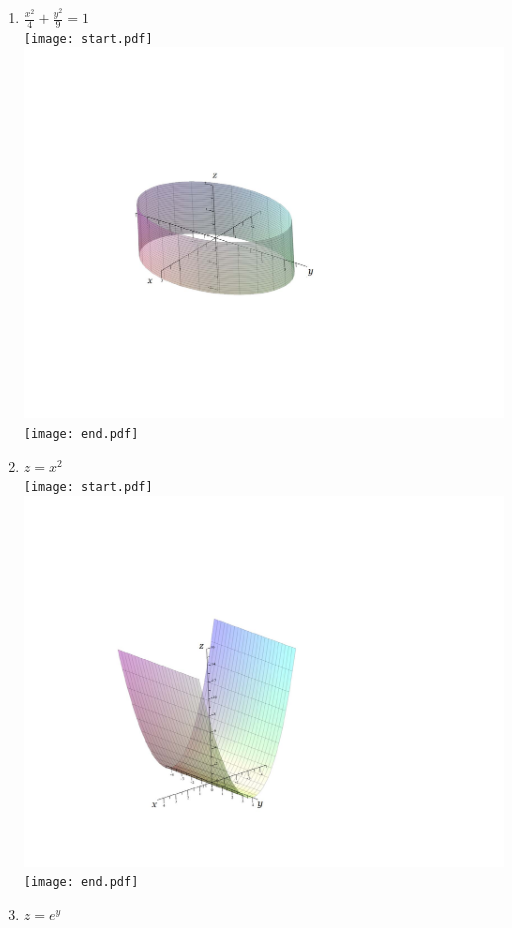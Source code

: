 \documentclass[12pt]{article}
\begin{document}
\begin{enumerate}
\begin{enumerate}
\item $\frac{x^2}{4}+\frac{y^2}{9}=1$\\

\texttt{[image: start.pdf]}
{{\includegraphics[scale=0.5]{ellipse.pdf}}}
\texttt{[image: end.pdf]}


\newpage

\item $z=x^2$\\

\texttt{[image: start.pdf]}
{{\includegraphics[scale=0.5]{parabola.pdf}}}
\texttt{[image: end.pdf]}


\item $z=e^y$


\end{enumerate}
\end{enumerate}
\end{document}
